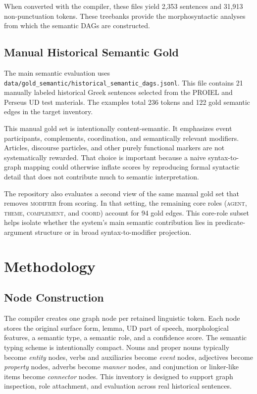 \documentclass[11pt]{article}
\begin{document}
When converted with the compiler, these files yield 2,353
sentences and 31,913 non-punctuation tokens. These treebanks provide the
morphosyntactic analyses from which the semantic DAGs are constructed.

\subsection{Manual Historical Semantic Gold}
The main semantic evaluation uses
\texttt{data/gold\_semantic/historical\_semantic\_dags.jsonl}. This file contains
21 manually labeled historical Greek sentences selected from the PROIEL and
Perseus UD test materials. The examples total 236 tokens and 122 gold semantic
edges in the target inventory.

This manual gold set is intentionally content-semantic. It emphasizes event
participants, complements, coordination, and semantically relevant modifiers.
Articles, discourse particles, and other purely functional markers are not
systematically rewarded. That choice is important because a naive syntax-to-graph
mapping could otherwise inflate scores by reproducing formal syntactic detail
that does not contribute much to semantic interpretation.

The repository also evaluates a second view of the same manual gold set that
removes \textsc{modifier} from scoring. In that setting, the remaining core roles
(\textsc{agent}, \textsc{theme}, \textsc{complement}, and \textsc{coord}) account
for 94 gold edges. This core-role subset helps isolate whether the system's main
semantic contribution lies in predicate-argument structure or in broad
syntax-to-modifier projection.

\section{Methodology}
\subsection{Node Construction}
The compiler creates one graph node per retained linguistic token. Each node
stores the original surface form, lemma, UD part of speech, morphological
features, a semantic type, a semantic role, and a confidence score. The semantic
typing scheme is intentionally compact. Nouns and proper nouns typically become
\emph{entity} nodes, verbs and auxiliaries become \emph{event} nodes, adjectives
become \emph{property} nodes, adverbs become \emph{manner} nodes, and conjunction
or linker-like items become \emph{connector} nodes. This inventory is designed
to support graph inspection, role attachment, and evaluation across real
historical sentences.
\end{document}
